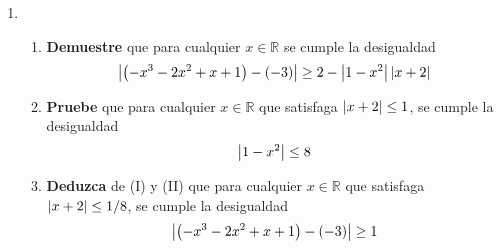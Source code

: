 \documentclass[12pt]{article}
\begin{document}
\begin{enumerate}
\begin{proof}
\begin{equation*}
\begin{split}
                =&\frac{17\cdot4}{3\cdot9}\abs{x-2}\\
                =&\frac{68}{27}\abs{x-2}\\
                \Rightarrow\abs{\frac{1}{2x^2-5}-\frac{1}{3}}\leq&\frac{68}{27}\abs{x-2}
            \end{split}
        \end{equation*}
        De (II): Como $\abs{x-2}\leq\min\left\{\frac{27}{68}\varepsilon,\frac{1}{4}\right\}$, en particular $\abs{x-2}\leq1/4$. Por (I) se cumple que:
        \begin{equation*}
            \abs{\frac{1}{2x^2-5}-\frac{1}{3}}\leq\frac{68}{27}\abs{x-2}
        \end{equation*}
        Además, $\abs{x-2}\leq\frac{27}{68}\varepsilon$. Por tanto:
        \begin{equation*}
            \begin{split}
                \abs{\frac{1}{2x^2-5}-\frac{1}{3}}\leq&\frac{68}{27}\abs{x-2}\\
                \leq&\frac{68}{27}\cdot\frac{27}{68}\varepsilon\\
                =&\varepsilon\\
                \Rightarrow\abs{\frac{1}{2x^2-5}-\frac{1}{3}}\leq&\varepsilon
            \end{split}
        \end{equation*}
        \qed
    \end{proof}
    \item \begin{enumerate}
        \item \textbf{Demuestre} que para cualquier $x\in\mathbb{R}$ se cumple la desigualdad
        \begin{equation*}
            \left| \left(-x^3-2x^2+x+1\right)-\left(-3\right) \right|\geq2-\left| 1-x^2 \right|\left| x+2 \right|
        \end{equation*}
        \item \textbf{Pruebe} que para cualquier $x\in\mathbb{R}$ que satisfaga $\left| x+2 \right|\leq1$, se cumple la desigualdad
        \begin{equation*}
            \left| 1-x^2 \right|\leq8
        \end{equation*}
        \item \textbf{Deduzca} de (I) y (II) que para cualquier $x\in\mathbb{R}$ que satisfaga $\left| x+2 \right|\leq1/8$, se cumple la desigualdad
        \begin{equation*}
            \abs{\left(-x^3-2x^2+x+1\right)-\left(-3\right)}\geq1

\end{equation*}
\end{enumerate}
\end{enumerate}
\end{document}
